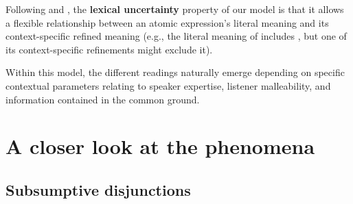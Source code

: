 \documentclass{article}
\begin{document}
\begin{examples}
\begin{examples}
  \item Following \citet{Bergen:Goodman:Levy:2012} and
    \citet{Smith:Goodman:Frank:2013}, the \textbf{lexical uncertainty}
    property of our model is that it allows a flexible relationship
    between an atomic expression's literal meaning and its
    context-specific refined meaning (e.g., the literal meaning of
     includes , but one of its context-specific
    refinements might exclude it).
  \end{examples}

\item Within this model, the different readings naturally emerge
  depending on specific contextual parameters relating to speaker
  expertise, listener malleability, and information contained in the
  common ground.

\end{examples}


\section{A closer look at the phenomena}\label{sec:data}


\subsection{Subsumptive disjunctions}\label{sec:data:subsumptive}
\end{document}
